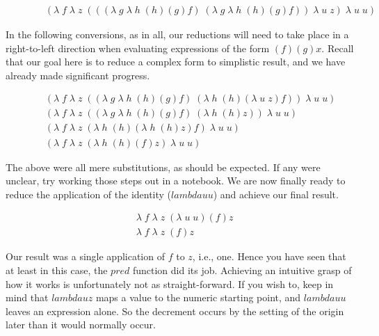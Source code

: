 \begin{figure}[htp]
\caption{}\label{scheme}
\begin{align*}
& (\lambda \; f \; \lambda \; z \; (((\lambda \; g \; \lambda \; h \; (h)(g)f) \; (\lambda \; g \; \lambda \; h \; (h)(g)f)) \; \lambda \; u \; z) \; \lambda \; u \; u)
\end{align*}
\end{figure}

In the following conversions, as in all, our reductions will need to take place in 
a right-to-left direction when evaluating expressions of the form $(f)(g)x$.
Recall that our goal here is to reduce a complex form to simplistic result, and we 
have already made significant progress.

\begin{figure}[htp]
\caption{}\label{scheme}
\begin{align*}
& (\lambda \; f \; \lambda \; z \; ((\lambda \; g \; \lambda \; h \; (h)(g)f) \; (\lambda \; h \; (h)(\lambda \; u \; z)f)) \; \lambda \; u \; u)
\\& (\lambda \; f \; \lambda \; z \; ((\lambda \; g \; \lambda \; h \; (h)(g)f) \; (\lambda \; h \; (h)z)) \; \lambda \; u \; u)
\\& (\lambda \; f \; \lambda \; z \; (\lambda \; h \; (h)(\lambda \; h \; (h)z)f) \; \lambda \; u \; u)
\\& (\lambda \; f \; \lambda \; z \; (\lambda \; h \; (h)(f)z) \; \lambda \; u \; u)
\end{align*}
\end{figure}
The above were all mere substitutions, as should be expected. If any were unclear, 
try working those steps out in a notebook. We are now finally ready to reduce the
application of the identity ($lambda u u$) and achieve our final result.

\begin{figure}[htp]
\caption{}\label{scheme}
\begin{align*}
& \lambda \; f \; \lambda \; z \; (\lambda \; u \; u)(f)z
\\& \lambda \; f \; \lambda \; z \; (f)z
\end{align*}
\end{figure}

Our result was a single application of $f$ to $z$, i.e., one. Hence you have seen 
that at least in this case, the $pred$ function did its job. Achieving an
intuitive grasp of how it works is unfortunately not as straight-forward. If you
wish to, keep in mind that $lambda u z$ maps a value to the numeric starting
point, and $lambda u u$ leaves an expression alone. So the decrement occurs by
the setting of the origin later than it would normally occur.

